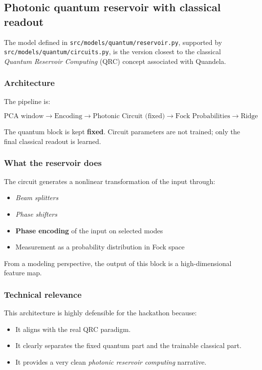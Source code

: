 \documentclass[11pt,a4paper]{article}
\begin{document}
\subsection{Photonic quantum reservoir with classical readout}

The model defined in \texttt{src/models/quantum/reservoir.py}, supported by \texttt{src/models/quantum/circuits.py}, is the version closest to the classical \textit{Quantum Reservoir Computing} (QRC) concept associated with Quandela.

\subsubsection{Architecture}
The pipeline is:

\[
\text{PCA window} \rightarrow \text{Encoding} \rightarrow \text{Photonic Circuit (fixed)} \rightarrow \text{Fock Probabilities} \rightarrow \text{Ridge}
\]

The quantum block is kept \textbf{fixed}. Circuit parameters are not trained; only the final classical readout is learned.

\subsubsection{What the reservoir does}
The circuit generates a nonlinear transformation of the input through:

\begin{itemize}
    \item \textit{Beam splitters}
    \item \textit{Phase shifters}
    \item \textbf{Phase encoding} of the input on selected modes
    \item Measurement as a probability distribution in Fock space
\end{itemize}

From a modeling perspective, the output of this block is a high-dimensional feature map.

\subsubsection{Technical relevance}
This architecture is highly defensible for the hackathon because:

\begin{itemize}
    \item It aligns with the real QRC paradigm.
    \item It clearly separates the fixed quantum part and the trainable classical part.
    \item It provides a very clean \textit{photonic reservoir computing} narrative.
\end{itemize}
\end{document}

